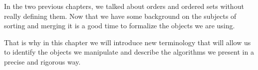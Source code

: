 
In the two previous chapters, we talked about orders and ordered sets without
really defining them. Now that we have some background on the subjects of
sorting and merging it is a good time to formalize the objects we are using.

That is why in this chapter we will introduce new terminology that will allow
us to identify the objects we manipulate and describe the algorithms we present
in a precise and rigorous way.
